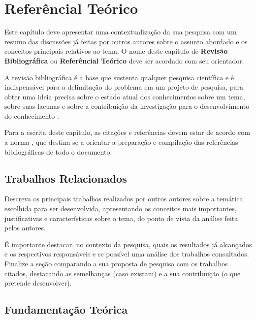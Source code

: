 \chapter{Referêncial Teórico} \label{RevisaoBibliografica}

Este capítulo deve apresentar uma contextualização da sua pesquisa com um resumo das discussões já feitas por outros autores sobre o assunto abordado e os conceitos principais relativos ao tema. O nome deste capítulo  de \textbf{Revisão Bibliográfica} ou \textbf{Referêncial Teórico} deve ser acordado com seu orientador.

A revisão bibliográfica é a base que sustenta qualquer pesquisa científica e  é indispensável para a delimitação do problema em um projeto de pesquisa,  para obter uma ideia precisa sobre o estado atual dos conhecimentos sobre um tema, sobre suas lacunas e sobre a contribuição da investigação para o desenvolvimento do conhecimento \cite{marconi2003}. 

Para a escrita deste capítulo, as citações e referências devem estar de acordo com a norma \cite{NBR6023:2002}, que destina-se a orientar a preparação e compilação das  referências bibliográficas de todo o documento.

\section{Trabalhos Relacionados}

Descreva os principais trabalhos realizados por outros autores sobre a temática escolhida para ser desenvolvida, apresentando os conceitos mais importantes, justificativas e características sobre o tema, do ponto de vista da análise feita pelos autores. 

É importante destacar, no contexto da pesquisa, quais os resultados já alcançados e os respectivos responsáveis e se possível uma análise  dos trabalhos consultados. Finalize a seção comparando a sua proposta de pesquisa com os trabalhos citados, destacando as semelhanças (caso existam) e a sua contribuição (o que pretende desenvolver).


\section{Fundamentação Teórica}

